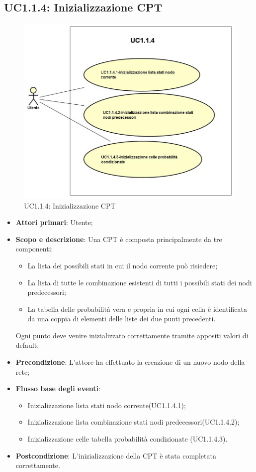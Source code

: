 \subsection{UC1.1.4: Inizializzazione CPT} 
\hypertarget{UC1.1.4}{} 
\begin{figure} [H]
	\centering
	\includegraphics[scale=0.45]{Img/UC1-1-4} 
	\caption{UC1.1.4: Inizializzazione CPT} \label{} 
\end{figure} 
\begin{itemize} 
	\item{\textbf{Attori primari}: Utente;} 
	\item{\textbf{Scopo e descrizione}: Una CPT è composta principalmente da tre componenti: 
		\begin{itemize} 
			\item{La lista dei possibili stati in cui il nodo corrente può risiedere;} 
			\item{La lista di tutte le combinazione esistenti di tutti i possibili stati dei nodi predecessori;} 
			\item{La tabella delle probabilità vera e propria in cui ogni cella è identificata da una coppia di elementi delle liste dei due punti precedenti.} 
		\end{itemize} 			
		Ogni punto deve venire inizializzato correttamente tramite appositi valori di default;
	} 
	\item{\textbf{Precondizione}: L'attore ha effettuato la creazione di un nuovo nodo della rete;} 
	\item{\textbf{Flusso base degli eventi}: } 
	\begin{itemize} 
		\item{Inizializzazione lista stati nodo corrente(UC1.1.4.1);} 
		\item{Inizializzazione lista combinazione stati nodi predecessori(UC1.1.4.2);} 
		\item{Inizializzazione celle tabella probabilità condizionate (UC1.1.4.3).} 
	\end{itemize} 
	\item{\textbf{Postcondizione}: L'inizializzazione della CPT è stata completata correttamente.} 
\end{itemize} 
